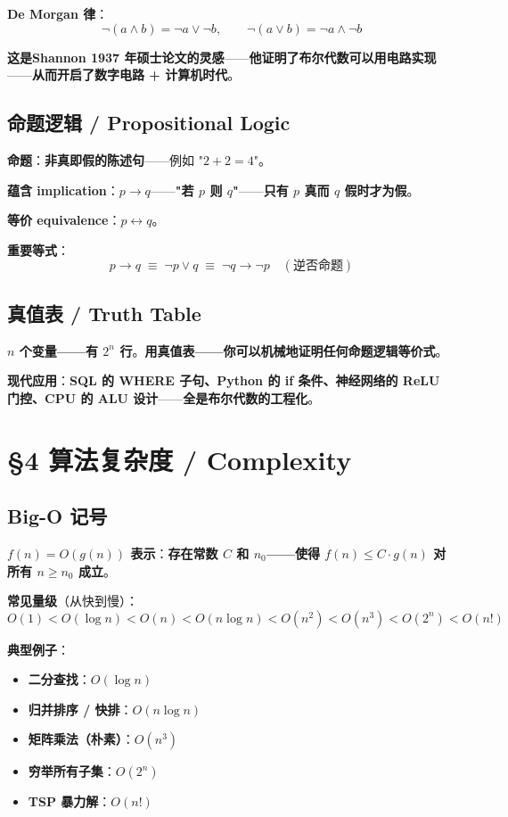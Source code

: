 \textbf{De Morgan 律}：
\[
\neg(a \land b) = \neg a \lor \neg b, \qquad \neg(a \lor b) = \neg a \land \neg b
\]

\textbf{这是\textbf{Shannon 1937 年硕士论文}的灵感}——\textbf{他证明了\textbf{布尔代数可以用电路实现}}——\textbf{从而开启了数字电路 + 计算机时代}。

\subsection{命题逻辑 / Propositional Logic}

\textbf{命题}：\textbf{非真即假的陈述句}——例如 "$2+2 = 4$"。

\textbf{蕴含 implication}：$p \to q$——\textbf{"若 $p$ 则 $q$"}——\textbf{只有 $p$ 真而 $q$ 假时才为假}。

\textbf{等价 equivalence}：$p \leftrightarrow q$。

\textbf{重要等式}：
\[
p \to q \;\equiv\; \neg p \lor q \;\equiv\; \neg q \to \neg p \quad (\text{逆否命题})
\]

\subsection{真值表 / Truth Table}

\textbf{$n$ 个变量——\textbf{有 $2^n$ 行}}。\textbf{用真值表——\textbf{你可以机械地证明任何命题逻辑等价式}}。

\textbf{现代应用}：\textbf{SQL 的 WHERE 子句、Python 的 if 条件、神经网络的 ReLU 门控、CPU 的 ALU 设计}——\textbf{全是布尔代数的工程化}。

\section{§4 算法复杂度 / Complexity}

\subsection{Big-O 记号}

\textbf{$f(n) = O(g(n))$ 表示}：\textbf{存在常数 $C$ 和 $n_0$——\textbf{使得 $f(n) \le C \cdot g(n)$ 对所有 $n \ge n_0$ 成立}}。

\textbf{常见量级}（从快到慢）：
\[
O(1) < O(\log n) < O(n) < O(n \log n) < O(n^2) < O(n^3) < O(2^n) < O(n!)
\]

\textbf{典型例子}：

\begin{itemize}
\item \textbf{二分查找}：$O(\log n)$
\item \textbf{归并排序 / 快排}：$O(n \log n)$
\item \textbf{矩阵乘法（朴素）}：$O(n^3)$
\item \textbf{穷举所有子集}：$O(2^n)$
\item \textbf{TSP 暴力解}：$O(n!)$
\end{itemize}

